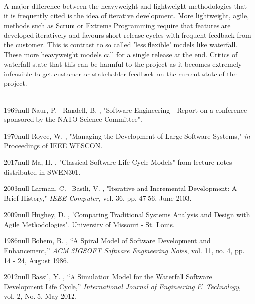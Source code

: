 \documentclass{CRPITStyle}
\begin{document}
		~\\
				A major difference between the heavyweight and lightweight methodologies that it is frequently cited is the idea of iterative development. More 
		lightweight, agile, methods such as Scrum or Extreme Programming require that features are developed iteratively
		and favours short release cycles with frequent feedback from the customer. This is contrast to so called 'less flexible'
		models like waterfall. These more heavyweight models call for a single release at the end. Critics of waterfall state
		that this can be harmful to the project as it becomes extremely infeasible to get customer or stakeholder feedback
		on the current state of the project.\\
		~\\

\begin{thebibliography}{xx}

  	{1969}{null}
	Naur, P. \harvardand\ Randell, B.  \harvardyearright , "Software Engineering - Report on a conference sponsored by the NATO Science Committee".
	
	\harvarditem{[Royce]}
	{1970}{null}
	Royce, W. \harvardyearright, "Managing the Development of Large Software Systems," {\em in} Proceedings of IEEE WESCON.

	\harvarditem{[Ma]}
	{2017}{null}
	Ma, H. \harvardyearright, "Classical Software Life Cycle Models" from lecture notes distributed in SWEN301.
	
	\harvarditem{[Larman]}
	{2003}{null}
	Larman, C. \harvardand\ Basili, V. \harvardyearright, "Iterative and Incremental Development: A Brief History,"\textit{ IEEE Computer,} vol. 36, pp. 47-56, June 2003.
	
	\harvarditem{[Hughey]}
	{2009}{null}
	Hughey, D. \harvardyearright, "Comparing Traditional Systems Analysis and Design with Agile Methodologies". University of
	Missouri - St. Louis.
	
	\harvarditem{[Boehm]}
	{1986}{null}
	Bohem, B. \harvardyearright, ``A Spiral Model of Software Development and Enhancement,''\textit{ ACM SIGSOFT Software Engineering
	Notes}, vol. 11, no. 4, pp. 14 - 24, August 1986.
	
	\harvarditem{[Bassil]}
	{2012}{null}
	Bassil, Y. \harvardyearright, ``A Simulation Model for the Waterfall Software Development Life Cycle,'' \textit{International Journal of Engineering \&\ Technology},
	vol. 2, No. 5, May 2012.
	

\end{thebibliography}
\end{document}
